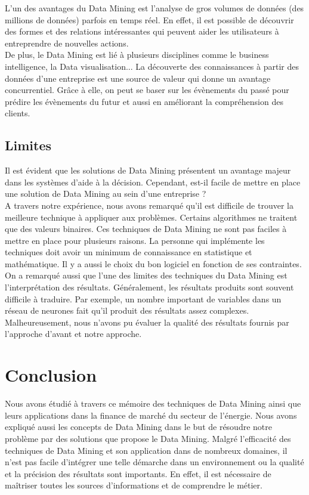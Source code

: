 \documentclass[11pt,a4paper]{report}
\begin{document}
L'un des avantages du Data Mining est l'analyse de gros volumes de données (des millions de données) parfois en temps réel. En effet, il est possible de découvrir des formes et des relations intéressantes qui peuvent aider les utilisateurs  à entreprendre de nouvelles actions.\\

De plus, le Data Mining est lié à plusieurs disciplines comme le business intelligence, la Data visualisation... La découverte des connaissances  à partir des données d'une entreprise est une source de valeur qui donne un avantage concurrentiel. Grâce à elle, on peut se baser sur les évènements du passé pour prédire les évènements du futur et aussi en améliorant la compréhension des clients. \\


\subsection{Limites}
Il est évident que les solutions de Data Mining présentent un avantage majeur dans les systèmes d'aide à la décision. Cependant, est-il facile de mettre en place une solution de Data Mining au sein d'une entreprise ? \\

A travers notre expérience, nous avons remarqué qu'il est difficile de trouver la meilleure technique à appliquer aux problèmes. Certains algorithmes ne traitent que des valeurs binaires. Ces techniques de Data Mining ne sont pas faciles à mettre en place pour plusieurs raisons. La personne qui implémente les techniques doit avoir un minimum de connaissance en statistique et mathématique. Il y a aussi le choix du bon logiciel en fonction de ses contraintes.  \\

On a remarqué aussi que l'une des limites des techniques du Data Mining est l'interprétation des résultats. Généralement, les résultats produits sont souvent difficile à traduire. Par exemple, un nombre important de variables dans un réseau de neurones fait qu'il produit des résultats assez complexes. Malheureusement, nous n'avons pu évaluer la qualité des résultats fournis par l'approche d'avant et notre approche.



\newpage
\section{Conclusion \label{conclusion}}
Nous avons étudié à travers ce mémoire des techniques de Data Mining ainsi que leurs applications dans la finance de marché du secteur de l'énergie. Nous avons expliqué aussi les concepts de Data Mining dans le but de résoudre notre problème par des solutions que propose le Data Mining. Malgré l'efficacité des techniques de Data Mining et son application dans de nombreux domaines, il n'est pas facile d'intégrer une telle démarche dans un environnement ou la qualité et la précision des résultats sont importants. En effet, il est nécessaire de maîtriser toutes les sources d'informations et de comprendre le métier.\\
\end{document}
